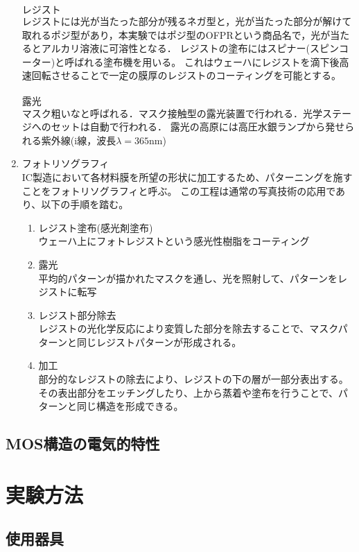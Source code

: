 \documentclass[11pt]{jarticle}
\begin{document}
\begin{enumerate}
				$\boldsymbol{レジスト}$\\
					レジストには光が当たった部分が残るネガ型と，光が当たった部分が解けて取れるポジ型があり，本実験ではポジ型のOFPRという商品名で，光が当たるとアルカリ溶液に可溶性となる．
					レジストの塗布にはスピナー(スピンコーター)と呼ばれる塗布機を用いる。
					これはウェーハにレジストを滴下後高速回転させることで一定の膜厚のレジストのコーティングを可能とする。\\
				\\
				$\boldsymbol{露光}$\\
					マスク粗いなと呼ばれる．マスク接触型の露光装置で行われる．光学ステージへのセットは自動で行われる．
					露光の高原には高圧水銀ランプから発せられる紫外線(i線，波長$\lambda = 365$nm)


			\item フォトリソグラフィ\\
				IC製造において各材料膜を所望の形状に加工するため、パターニングを施すことをフォトリソグラフィと呼ぶ。
				この工程は通常の写真技術の応用であり、以下の手順を踏む。
				\begin{enumerate}
					\item レジスト塗布(感光剤塗布)\\
						ウェーハ上にフォトレジストという感光性樹脂をコーティング
					\item 露光\\
						平均的パターンが描かれたマスクを通し、光を照射して、パターンをレジストに転写
					\item レジスト部分除去\\
						レジストの光化学反応により変質した部分を除去することで、マスクパターンと同じレジストパターンが形成される。
					\item 加工\\
						部分的なレジストの除去により、レジストの下の層が一部分表出する。
						その表出部分をエッチングしたり、上から蒸着や塗布を行うことで、パターンと同じ構造を形成できる。
				\end{enumerate}
		\end{enumerate}

	\subsection{MOS構造の電気的特性}
		

\section{実験方法}
	\subsection{使用器具}
\end{document}

